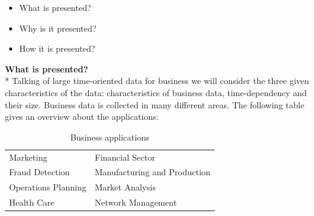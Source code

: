 \begin{itemize}
    \item What is presented?
    \item Why is it presented?
    \item How it is presented?
\end{itemize}
\textbf{What is presented?}\\*
Talking of large time-oriented data for business we will consider the three given characteristics of the data: characteristics of business data, time-dependency and their size. Business data is collected in many different areas. The following table gives an overview about the applications: 

\begin{table}[th]
	\centering
	\caption[Table 1]{Business applications\cite{Brachman1996,Tegarden1999}}
	\label{businessapplications}
	\begin{tabu}{ll}
	\toprule
	Marketing & Financial Sector \\
	Fraud Detection & Manufacturing and Production \\
	Operations Planning & Market Analysis \\
	Health Care & Network Management\\
	\bottomrule
	\end{tabu}
\end{table}

